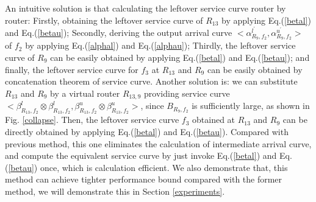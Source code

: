 \documentclass[10pt,journal]{IEEEtran}
\begin{document}
An intuitive solution is that calculating the leftover service curve router by router: Firstly, obtaining the leftover service curve of $R_{13}$ by applying Eq.(\ref{betal}) and Eq.(\ref{betau}); Secondly, deriving the output arrival curve $<\alpha_{R_{9},f_2}^{l^\prime},\alpha_{R_{9},f_2}^{u^\prime}>$ of $f_2$ by applying Eq.(\ref{alphal}) and Eq.(\ref{alphau}); Thirdly, the leftover service curve of $R_9$ can be easily obtained by applying Eq.(\ref{betal}) and Eq.(\ref{betau}); and finally, the leftover service curve for $f_3$ at $R_{13}$ and $R_9$ can be easily obtained by concatenation theorem of service curve. Another solution is: we can substitute $R_{13}$ and $R_{9}$ by a virtual router $R_{13,9}$ providing service curve $<\beta_{R_{13},f_2}^l\otimes\beta_{R_{13},f_2}^l,\beta_{R_{13},f_2}^u\otimes\beta_{R_{13},f_2}^u>$, since $B_{R_9,f_2}$ is sufficiently large, as shown in Fig. \ref{collapse}. Then, the leftover service curve $f_3$ obtained at $R_{13}$ and $R_{9}$ can be directly obtained by applying Eq.(\ref{betal}) and Eq.(\ref{betau}). Compared with previous method, this one eliminates the calculation of intermediate arrival curve, and compute the equivalent service curve by just invoke Eq.(\ref{betal}) and Eq.(\ref{betau}) once, which is calculation efficient. We also demonstrate that, this method can achieve tighter performance bound compared with the former method, we will demonstrate this in Section \ref{experiments}.
\end{document}

